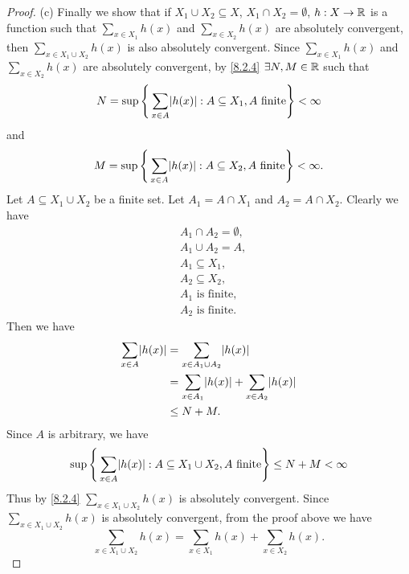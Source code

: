 \begin{proof}{(c)}
  Finally we show that if \(X_1 \cup X_2 \subseteq X\), \(X_1 \cap X_2 = \emptyset\), \(h : X \to \mathbb{R}\) is a function such that \(\sum_{x \in X_1} h(x)\) and \(\sum_{x \in X_2} h(x)\) are absolutely convergent, then \(\sum_{x \in X_1 \cup X_2} h(x)\) is also absolutely convergent.
  Since \(\sum_{x \in X_1} h(x)\) and \(\sum_{x \in X_2} h(x)\) are absolutely convergent, by \cref{8.2.4} \(\exists N, M \in \mathbb{R}\) such that
  \[
    N = \sup\Bigg\{\sum_{x \in A} \abs{h(x)} : A \subseteq X_1, A \text{ finite}\Bigg\} < \infty
  \]
  and
  \[
    M = \sup\Bigg\{\sum_{x \in A} \abs{h(x)} : A \subseteq X_2, A \text{ finite}\Bigg\} < \infty.
  \]
  Let \(A \subseteq X_1 \cup X_2\) be a finite set.
  Let \(A_1 = A \cap X_1\) and \(A_2 = A \cap X_2\).
  Clearly we have
  \begin{align*}
     & A_1 \cap A_2 = \emptyset, \\
     & A_1 \cup A_2 = A,         \\
     & A_1 \subseteq X_1,        \\
     & A_2 \subseteq X_2,        \\
     & A_1 \text{ is finite},    \\
     & A_2 \text{ is finite}.
  \end{align*}
  Then we have
  \begin{align*}
    \sum_{x \in A} \abs{h(x)} & = \sum_{x \in A_1 \cup A_2} \abs{h(x)}                      \\
                              & = \sum_{x \in A_1} \abs{h(x)} + \sum_{x \in A_2} \abs{h(x)} \\
                              & \leq N + M.
  \end{align*}
  Since \(A\) is arbitrary, we have
  \[
    \sup\Bigg\{\sum_{x \in A} \abs{h(x)} : A \subseteq X_1 \cup X_2, A \text{ finite}\Bigg\} \leq N + M < \infty
  \]
  Thus by \cref{8.2.4} \(\sum_{x \in X_1 \cup X_2} h(x)\) is absolutely convergent.
  Since \(\sum_{x \in X_1 \cup X_2} h(x)\) is absolutely convergent, from the proof above we have
  \[
    \sum_{x \in X_1 \cup X_2} h(x) = \sum_{x \in X_1} h(x) + \sum_{x \in X_2} h(x).
  \]
\end{proof}

